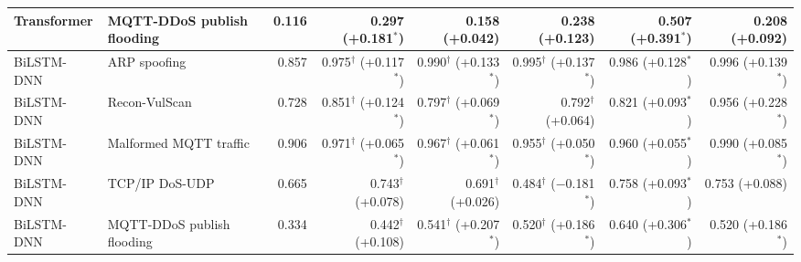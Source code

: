 \begin{table}[!htbp]
{\begin{tabular}{llrrrrrr}
Transformer & MQTT-DDoS publish flooding & 0.116 & 0.297 (+0.181$^{*}$) & 0.158 (+0.042) & 0.238 (+0.123) & 0.507 (+0.391$^{*}$) & 0.208 (+0.092) \\
\midrule
BiLSTM-DNN & ARP spoofing & 0.857 & 0.975$^{\dagger}$ (+0.117$^{*}$) & 0.990$^{\dagger}$ (+0.133$^{*}$) & 0.995$^{\dagger}$ (+0.137$^{*}$) & 0.986 (+0.128$^{*}$) & 0.996 (+0.139$^{*}$) \\
BiLSTM-DNN & Recon-VulScan & 0.728 & 0.851$^{\dagger}$ (+0.124$^{*}$) & 0.797$^{\dagger}$ (+0.069$^{*}$) & 0.792$^{\dagger}$ (+0.064) & 0.821 (+0.093$^{*}$) & 0.956 (+0.228$^{*}$) \\
BiLSTM-DNN & Malformed MQTT traffic & 0.906 & 0.971$^{\dagger}$ (+0.065$^{*}$) & 0.967$^{\dagger}$ (+0.061$^{*}$) & 0.955$^{\dagger}$ (+0.050$^{*}$) & 0.960 (+0.055$^{*}$) & 0.990 (+0.085$^{*}$) \\
BiLSTM-DNN & TCP/IP DoS-UDP & 0.665 & 0.743$^{\dagger}$ (+0.078) & 0.691$^{\dagger}$ (+0.026) & 0.484$^{\dagger}$ ($-$0.181$^{*}$) & 0.758 (+0.093$^{*}$) & 0.753 (+0.088) \\
BiLSTM-DNN & MQTT-DDoS publish flooding & 0.334 & 0.442$^{\dagger}$ (+0.108) & 0.541$^{\dagger}$ (+0.207$^{*}$) & 0.520$^{\dagger}$ (+0.186$^{*}$) & 0.640 (+0.306$^{*}$) & 0.520 (+0.186$^{*}$) \\
\bottomrule
\end{tabular}
}
\par{}
\end{table}
